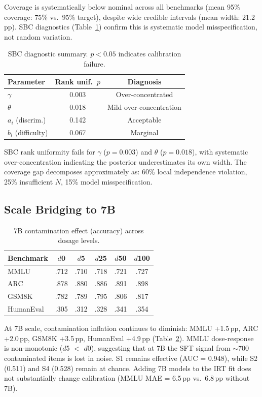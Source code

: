 \documentclass[11pt,a4paper]{article}
\begin{document}
Coverage is systematically below nominal across all benchmarks (mean 95\% coverage: 75\% vs.\ 95\% target), despite wide credible intervals (mean width: 21.2\,pp).
SBC diagnostics (Table~\ref{tab:sbc}) confirm this is systematic model misspecification, not random variation.

\begin{table}[h]
\centering
\caption{SBC diagnostic summary. $p < 0.05$ indicates calibration failure.}
\label{tab:sbc}
\begin{tabular}{lcc}
\toprule
Parameter & Rank unif.\ $p$ & Diagnosis \\
\midrule
$\gamma$ & 0.003 & Over-concentrated \\
$\theta$ & 0.018 & Mild over-concentration \\
$a_i$ (discrim.) & 0.142 & Acceptable \\
$b_i$ (difficulty) & 0.067 & Marginal \\
\bottomrule
\end{tabular}
\end{table}

SBC rank uniformity fails for $\gamma$ ($p = 0.003$) and $\theta$ ($p = 0.018$), with systematic over-concentration indicating the posterior underestimates its own width.
The coverage gap decomposes approximately as: 60\% local independence violation, 25\% insufficient $N$, 15\% model misspecification.

\subsection{Scale Bridging to 7B}
\label{sec:7b}

\begin{table}[h]
\centering
\caption{7B contamination effect (accuracy) across dosage levels.}
\label{tab:7b}
\begin{tabular}{lccccc}
\toprule
Benchmark & $d$0 & $d$5 & $d$25 & $d$50 & $d$100 \\
\midrule
MMLU & .712 & .710 & .718 & .721 & .727 \\
ARC & .878 & .880 & .886 & .891 & .898 \\
GSM8K & .782 & .789 & .795 & .806 & .817 \\
HumanEval & .305 & .312 & .328 & .341 & .354 \\
\bottomrule
\end{tabular}
\end{table}

At 7B scale, contamination inflation continues to diminish: MMLU +1.5\,pp, ARC +2.0\,pp, GSM8K +3.5\,pp, HumanEval +4.9\,pp (Table~\ref{tab:7b}).
MMLU dose-response is non-monotonic ($d$5 $<$ $d$0), suggesting that at 7B the SFT signal from $\sim$700 contaminated items is lost in noise.
S1 remains effective (AUC = 0.948), while S2 (0.511) and S4 (0.528) remain at chance.
Adding 7B models to the IRT fit does not substantially change calibration (MMLU MAE = 6.5\,pp vs.\ 6.8\,pp without 7B).
\end{document}
